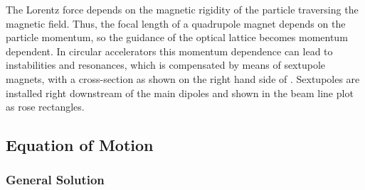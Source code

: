 The Lorentz force depends on the magnetic rigidity of the particle traversing the magnetic field. Thus, the focal length of a quadrupole magnet depends on the particle momentum, so the guidance of the optical lattice becomes momentum dependent. In circular accelerators this momentum dependence can lead to instabilities and resonances, which is compensated by means of sextupole magnets, with a cross-section as shown on the right hand side of . Sextupoles are installed right downstream of the main dipoles and shown in the beam line plot as rose rectangles.


\subsection{Equation of Motion}\label{chap:eqmotion}
\subsubsection{General Solution}

